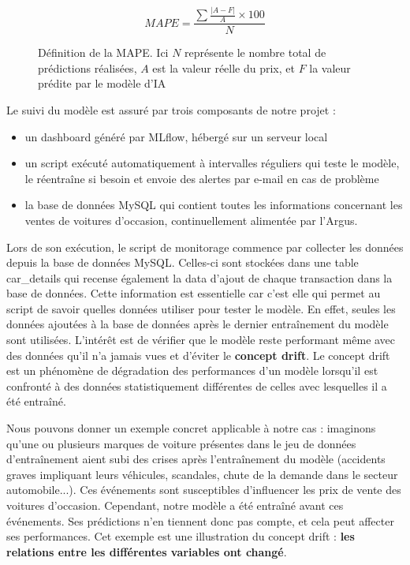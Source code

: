 \documentclass[french]{article}
\begin{document}
    \begin{figure}[h!]
        \begin{equation}MAPE = \frac {\sum \frac{\lvert A-F \rvert}{A} \times 100}{N}  \end{equation}
        \centering
        \caption{Définition de la MAPE. Ici $N$ représente le nombre total de prédictions réalisées, $A$ est la valeur réelle du prix, et $F$ la valeur prédite par le modèle d'IA}
        \centering
    \end{figure}

    Le suivi du modèle est assuré par trois composants de notre projet :
    \begin{itemize}
        \item un dashboard généré par MLflow, hébergé sur un serveur local
        \item un script exécuté automatiquement à intervalles réguliers qui teste le modèle, le réentraîne si besoin et envoie des alertes par e-mail en cas de problème
        \item la base de données MySQL qui contient toutes les informations concernant les ventes de voitures d'occasion, continuellement alimentée par l'Argus.
    \end{itemize}


    Lors de son exécution, le script de monitorage commence par collecter les données depuis la base de données MySQL. Celles-ci sont stockées dans une table car\_details qui recense également la data d'ajout de chaque transaction dans la base de données. Cette information est essentielle car c'est elle qui permet au script de savoir quelles données utiliser pour tester le modèle. En effet, seules les données ajoutées à la base de données après le dernier entraînement du modèle sont utilisées. L'intérêt est de vérifier que le modèle reste performant même avec des données qu'il n'a jamais vues et d'éviter le \textbf{concept drift}. Le concept drift est un phénomène de dégradation des performances d'un modèle lorsqu'il est confronté à des données statistiquement différentes de celles avec lesquelles il a été entraîné. 
    
    Nous pouvons donner un exemple concret applicable à notre cas : imaginons qu'une ou plusieurs marques de voiture présentes dans le jeu de données d'entraînement aient subi des crises après l'entraînement du modèle (accidents graves impliquant leurs véhicules, scandales, chute de la demande dans le secteur automobile...). Ces événements sont susceptibles d'influencer les prix de vente des voitures d'occasion. Cependant, notre modèle a été entraîné avant ces événements. Ses prédictions n'en tiennent donc pas compte, et cela peut affecter ses performances. Cet exemple est une illustration du concept drift : \textbf{les relations entre les différentes variables ont changé}.
\end{document}
